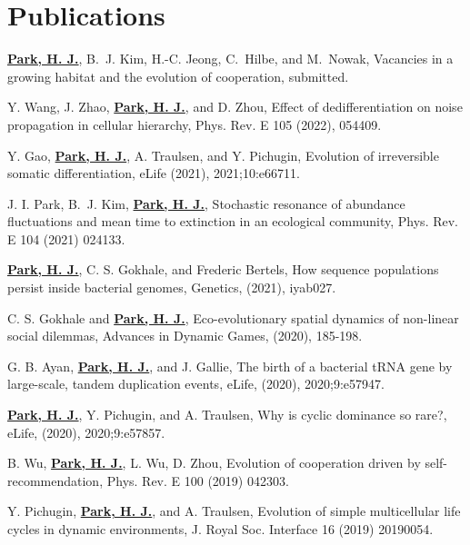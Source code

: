\documentclass[11pt,a4paper,sans]{moderncv}        %
\begin{document}
\section{Publications}
\renewcommand{\labelenumi}{[\theenumi]} 
\begin{etaremune}
\item
\underline{\textbf{Park, H. J.}}, B.~J. Kim, H.-C. Jeong, C.~Hilbe, and M.~Nowak, Vacancies in a growing habitat and the evolution of cooperation, submitted.

\item
Y. Wang, J. Zhao, \underline{\textbf{Park, H. J.}}, and D. Zhou, Effect of dedifferentiation on noise propagation in cellular hierarchy,	Phys. Rev. E 105 (2022), 054409.

\item
Y. Gao, \underline{\textbf{Park, H. J.}}, A. Traulsen, and Y. Pichugin, Evolution of irreversible somatic differentiation, eLife (2021), 2021;10:e66711.

\item
J. I. Park, B.~J. Kim, \underline{\textbf{Park, H. J.}}, Stochastic resonance of abundance fluctuations and mean time to extinction in an ecological community,  Phys. Rev. E 104 (2021) 024133.

\item
\underline{\textbf{Park, H. J.}}, C. S. Gokhale, and Frederic Bertels, How sequence populations persist inside bacterial genomes, Genetics, (2021), iyab027.

\item
C. S. Gokhale and \underline{\textbf{Park, H. J.}},
Eco-evolutionary spatial dynamics of non-linear social dilemmas, Advances in Dynamic Games, (2020), 185-198.

\item
G. B. Ayan, \underline{\textbf{Park, H. J.}}, and J. Gallie, The birth of a bacterial tRNA gene by large-scale, tandem duplication events, eLife, (2020), 2020;9:e57947.

\item
\underline{\textbf{Park, H. J.}}, Y. Pichugin, and A. Traulsen, Why is cyclic dominance so rare?,  eLife, (2020),  2020;9:e57857.

\item
B. Wu, \underline{\textbf{Park, H. J.}}, L. Wu, D. Zhou,
Evolution of cooperation driven by self-recommendation, Phys. Rev. E 100 (2019) 042303.
  
\item
Y. Pichugin, \underline{\textbf{Park, H. J.}}, and A. Traulsen,
Evolution of simple multicellular life cycles in dynamic environments, J. Royal Soc. Interface 16 (2019) 20190054.
  

\end{etaremune}
\end{document}
